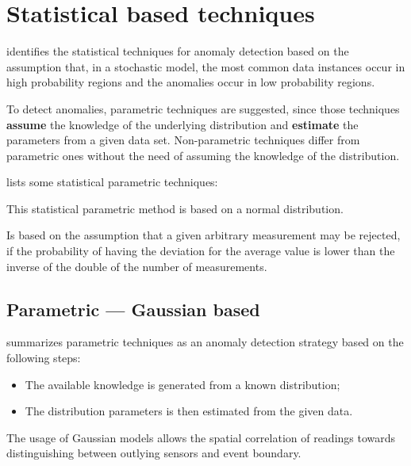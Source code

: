 \newpage

\section{Statistical based techniques}
\label{sec:statbased}



\cite{gen:chandola:2009} identifies the statistical techniques for anomaly detection based on the assumption that, in a stochastic model, the most common data instances occur in high probability regions and the anomalies occur in low probability regions.

To detect anomalies, parametric techniques are suggested, since those techniques \textbf{assume} the knowledge of the underlying distribution and \textbf{estimate} the parameters from a given data set. Non-parametric techniques differ from parametric ones without the need of assuming the knowledge of the distribution.

\cite{cluster:andrade2016} lists some statistical parametric techniques: 

\begin{description}
	\setlength\itemsep{-0.5em}
	\item[Peirce's Criterion]  
	This statistical parametric method is based on a normal distribution.
	\item[Chauvenet's Criterion]  
	Is based on the assumption that a given arbitrary measurement may be rejected, if the probability of having the deviation for the average value is lower than the inverse of the double of the number of measurements. 

\end{description}

\subsection{Parametric --- Gaussian based}
\cite{gen:zhang:2010} summarizes parametric techniques as an anomaly detection strategy based on the following steps:

\begin{itemize}
	\setlength\itemsep{-0.5em}
	\item The available knowledge is generated from a known distribution;
	\item The distribution parameters is then estimated from the given data.	
\end{itemize}

The usage of Gaussian  models allows the spatial correlation of readings towards distinguishing between outlying sensors and event boundary. 

